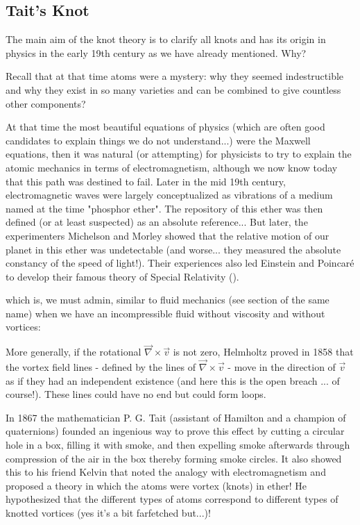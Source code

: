 {	\subsection{Tait's Knot}
	The main aim of the knot theory is to clarify all knots and has its origin in physics in the early 19th century as we have already mentioned. Why?
	
	Recall that at that time atoms were a mystery: why they seemed indestructible and why they exist in so many varieties and can be combined to give countless other components?
	
	At that time the most beautiful equations of physics (which are often good candidates to explain things we do not understand...) were the Maxwell equations, then it was natural (or attempting) for physicists to try to explain the atomic mechanics in terms of electromagnetism, although we now know today that this path was destined to fail. Later in the mid 19th century, electromagnetic waves were largely conceptualized as vibrations of a medium named at the time "phosphor ether". The repository of this ether was then defined (or at least suspected) as an absolute reference... But later, the experimenters Michelson and Morley showed that the relative motion of our planet in this ether was undetectable (and worse... they measured the absolute constancy of the speed of light!). Their experiences also led Einstein and Poincaré to develop their famous theory of Special Relativity ().
	
	which is, we must admin, similar to fluid mechanics (see section of the same name) when we have an incompressible fluid without viscosity and without vortices:
	
	More generally, if the rotational $\vec{ \nabla}\times \vec{v}$ is not zero, Helmholtz proved in 1858 that the vortex field lines - defined by the lines of $\vec{ \nabla}\times \vec{v}$ - move in the direction of $\vec{v}$ as if they had an independent existence (and here this is the open breach ... of course!). These lines could have no end but could form loops.
	
	In 1867 the mathematician P. G. Tait (assistant of Hamilton and a champion of quaternions) founded an ingenious way to prove this effect by cutting a circular hole in a box, filling it with smoke, and then expelling smoke afterwards through compression of the air in the box thereby forming smoke circles. It also showed this to his friend Kelvin that noted the analogy with electromagnetism and proposed a theory in which the atoms were vortex (knots) in ether! He hypothesized that the different types of atoms correspond to different types of knotted vortices (yes it's a bit farfetched but...)!
	
}
